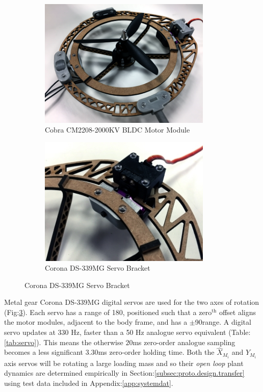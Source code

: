 \begin{figure}[htbp]
\centering
\begin{subfigure}{0.49\textwidth}
\centering
\includegraphics[width=0.9\textwidth]{figs/motor-bldc}
\caption{Cobra CM2208-2000KV BLDC Motor Module}
\label{fig:bldc-motor}
\end{subfigure}
\begin{subfigure}{0.49\textwidth}
\centering
\includegraphics[width=0.9\textwidth]{figs/motor-servo}
\caption{Corona DS-339MG Servo Bracket}
\label{fig:motor-servo}
\end{subfigure}
\end{figure}
\par
Metal gear Corona DS-339MG digital servos are used for the two axes of rotation (Fig:\ref{fig:motor-servo}). Each servo has a range of 180\textdegree , positioned such that a $\text{zero}^{\text{th}}$ offset aligns the motor modules, adjacent to the body frame, and has a $\pm $90\textdegree range. A digital servo updates at 330 Hz, faster than a 50 Hz analogue servo equivalent (Table:\ref{tab:servo}). This means the otherwise $20$ms zero-order analogue sampling becomes a less significant $3.30$ms zero-order holding time. Both the $\hat{X}_{M_i}$ and $\hat{Y}_{M_i}$ axis servos will be rotating a large loading mass and so their \emph{open loop} plant dynamics are determined empirically in Section:\ref{subsec:proto.design.transfer} using test data included in Appendix:\ref{app:systemdat}.
